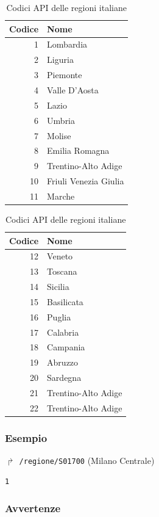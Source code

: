 \documentclass[12pt,a4paper,italian]{report}
\begin{document}
\begin{table}[h] \centering
    \begin{tabular}{r|l}
      Codice & Nome \\
      \hline
      1 & Lombardia \\
      2 & Liguria \\
      3 & Piemonte \\
      4 & Valle D'Aosta \\
      5 & Lazio \\
      6 & Umbria \\
      7 & Molise \\
      8 & Emilia Romagna \\
      9 & Trentino-Alto Adige \\
      10 & Friuli Venezia Giulia \\
      11 & Marche \\
    \end{tabular}
    \begin{tabular}{r|l}
      Codice & Nome \\
      \hline
      12 & Veneto \\
      13 & Toscana \\
      14 & Sicilia \\
      15 & Basilicata \\
      16 & Puglia \\
      17 & Calabria \\
      18 & Campania \\
      19 & Abruzzo \\
      20 & Sardegna \\
      21 & Trentino-Alto Adige \\
      22 & Trentino-Alto Adige
    \end{tabular}
    \caption{Codici API delle regioni italiane}
    \label{regioni}
\end{table}

\subsubsection{Esempio}

$\Rsh$ \texttt{/regione/S01700} \hfill (Milano Centrale)
\begin{verbatim}
1
\end{verbatim}

\subsubsection{Avvertenze}
\end{document}
